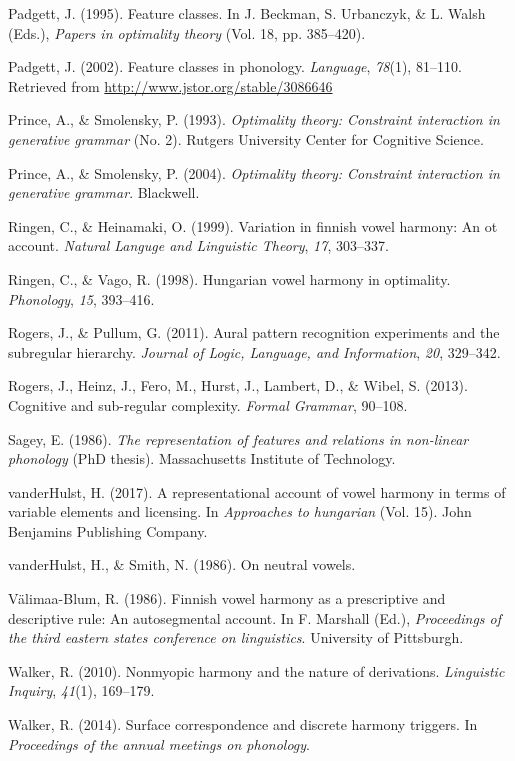 \documentclass[,doc,floatsintext]{apa6}
\theoremstyle{definition}
\theoremstyle{definition}
\theoremstyle{definition}
\theoremstyle{remark}
\begin{document}
\hypertarget{ref-padgett1995}{}
Padgett, J. (1995). Feature classes. In J. Beckman, S. Urbanczyk, \& L.
Walsh (Eds.), \emph{Papers in optimality theory} (Vol. 18, pp.
385--420).

\hypertarget{ref-padgett2002}{}
Padgett, J. (2002). Feature classes in phonology. \emph{Language},
\emph{78}(1), 81--110. Retrieved from
\url{http://www.jstor.org/stable/3086646}

\hypertarget{ref-princesmolensky1993}{}
Prince, A., \& Smolensky, P. (1993). \emph{Optimality theory: Constraint
interaction in generative grammar} (No. 2). Rutgers University Center
for Cognitive Science.

\hypertarget{ref-princesmolensky2004}{}
Prince, A., \& Smolensky, P. (2004). \emph{Optimality theory: Constraint
interaction in generative grammar}. Blackwell.

\hypertarget{ref-ringenheinamaki1999}{}
Ringen, C., \& Heinamaki, O. (1999). Variation in finnish vowel harmony:
An ot account. \emph{Natural Languge and Linguistic Theory}, \emph{17},
303--337.

\hypertarget{ref-ringenvago1998}{}
Ringen, C., \& Vago, R. (1998). Hungarian vowel harmony in optimality.
\emph{Phonology}, \emph{15}, 393--416.

\hypertarget{ref-rogerspullum2011}{}
Rogers, J., \& Pullum, G. (2011). Aural pattern recognition experiments
and the subregular hierarchy. \emph{Journal of Logic, Language, and
Information}, \emph{20}, 329--342.

\hypertarget{ref-rogersetal2013}{}
Rogers, J., Heinz, J., Fero, M., Hurst, J., Lambert, D., \& Wibel, S.
(2013). Cognitive and sub-regular complexity. \emph{Formal Grammar},
90--108.

\hypertarget{ref-sagey1986}{}
Sagey, E. (1986). \emph{The representation of features and relations in
non-linear phonology} (PhD thesis). Massachusetts Institute of
Technology.

\hypertarget{ref-vdHulst2017}{}
vanderHulst, H. (2017). A representational account of vowel harmony in
terms of variable elements and licensing. In \emph{Approaches to
hungarian} (Vol. 15). John Benjamins Publishing Company.

\hypertarget{ref-vdHulstSmith1986}{}
vanderHulst, H., \& Smith, N. (1986). On neutral vowels.

\hypertarget{ref-valimaablum1986}{}
Välimaa-Blum, R. (1986). Finnish vowel harmony as a prescriptive and
descriptive rule: An autosegmental account. In F. Marshall (Ed.),
\emph{Proceedings of the third eastern states conference on
linguistics}. University of Pittsburgh.

\hypertarget{ref-walker2010}{}
Walker, R. (2010). Nonmyopic harmony and the nature of derivations.
\emph{Linguistic Inquiry}, \emph{41}(1), 169--179.

\hypertarget{ref-walker2014}{}
Walker, R. (2014). Surface correspondence and discrete harmony triggers.
In \emph{Proceedings of the annual meetings on phonology}.
\end{document}
